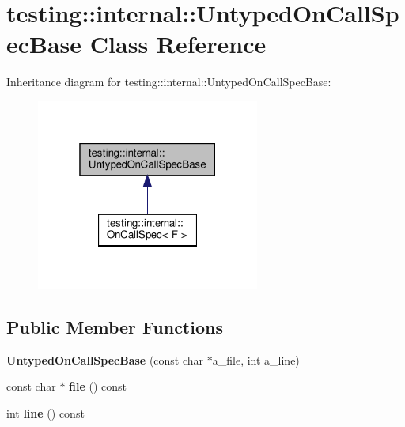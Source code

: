 \hypertarget{classtesting_1_1internal_1_1_untyped_on_call_spec_base}{}\section{testing\+:\+:internal\+:\+:Untyped\+On\+Call\+Spec\+Base Class Reference}
\label{classtesting_1_1internal_1_1_untyped_on_call_spec_base}


Inheritance diagram for testing\+:\+:internal\+:\+:Untyped\+On\+Call\+Spec\+Base\+:
\nopagebreak
\begin{figure}[H]
\begin{center}
\leavevmode
\includegraphics[width=208pt]{classtesting_1_1internal_1_1_untyped_on_call_spec_base__inherit__graph}
\end{center}
\end{figure}
\subsection*{Public Member Functions}
\begin{DoxyCompactItemize}
\item 
\mbox{\label{classtesting_1_1internal_1_1_untyped_on_call_spec_base_afc5da72d536ad61e2d66de87b2b9bc50}} 
{\bfseries Untyped\+On\+Call\+Spec\+Base} (const char $\ast$a\+\_\+file, int a\+\_\+line)
\item 
\mbox{\label{classtesting_1_1internal_1_1_untyped_on_call_spec_base_a5ccb6ee1208ee597528b44c7c9945fa3}} 
const char $\ast$ {\bfseries file} () const
\item 
\mbox{\label{classtesting_1_1internal_1_1_untyped_on_call_spec_base_a18e9eb7155380b3e124bccc0d8115b5e}} 
int {\bfseries line} () const
\end{DoxyCompactItemize}
